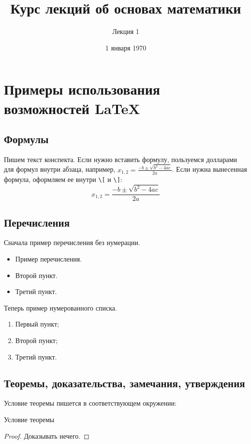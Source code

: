 \documentclass[russian]{lecture-notes}
\title{Курс лекций об основах математики}
\subtitle{Лекция 1}
\date{1 января 1970}
\begin{document}
\maketitle

\section{Примеры использования возможностей \LaTeX}
\subsection{Формулы}

Пишем текст конспекта.
Если нужно вставить формулу, пользуемся долларами для формул внутри абзаца,
например, $x_{1,2}=\frac{-b\pm\sqrt{b^2-4ac}}{2a}$.
Если нужна вынесенная формула, оформляем ее внутри
\verb|\[| и \verb|\]|:
\[x_{1,2}=\frac{-b\pm\sqrt{b^2-4ac}}{2a}\]

\subsection{Перечисления}

Сначала пример перечисления без нумерации.

\begin{itemize}
    \item Пример перечисления.
    \item Второй пункт.
    \item Третий пункт.
\end{itemize}
Теперь пример нумерованного списка.
\begin{enumerate}
    \item Первый пункт;
    \item Второй пункт;
    \item Третий пункт.
\end{enumerate}

\subsection{Теоремы, доказательства, замечания, утверждения}

Условие теоремы пишется в соответствующем окружении:

\begin{theorem}
    Условие теоремы
\end{theorem}
\begin{proof}
    Доказывать нечего.
\end{proof}
\end{document}
